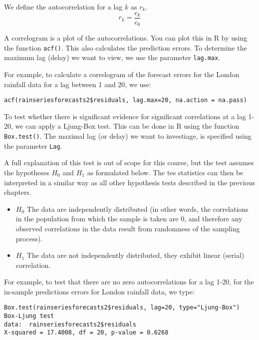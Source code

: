 \begin{definition}[Autocorrelation]
  We define the autocorrelation for a lag $k$ as $r_k$.
	\[ r_k = \frac{c_k}{c_0} \]
\end{definition}

A correlogram is a plot of the autocorrelations. You can plot this in R by using the function \texttt{acf()}. This also calculates the prediction errors. To determine the maximum lag (delay) we want to view, we use the parameter \texttt{lag.max}.

For example, to calculate a correlogram of the forecast errors for the London rainfall data for a lag between 1 and 20, we use:

\begin{lstlisting}
acf(rainseriesforecasts2$residuals, lag.max=20, na.action = na.pass)
\end{lstlisting}

To test whether there is significant evidence for significant correlations at a lag 1-20, we can apply a Ljung-Box test. This can be done in R using the function \texttt{Box.test()}. The maximal lag (or delay) we want to investiage, is specified using the parameter \texttt{Lag}.

A full explanation of this test is out of scope for this course, but the test assumes the hypotheses $H_0$ and $H_1$ as formulated below. The tes statistics can then be interpreted in a similar way as all other  hypothesis tests described in the previous chapters.

\begin{itemize}
  \item $H_0$ The data are independently distributed (in other words, the correlations in the population from which the sample is taken are 0, and therefore  any observed correlations in the data result from randomness of the sampling process).
  \item $H_1$ The data are not independently distributed, they exhibit linear (serial) correlation.
\end{itemize}

For example, to test that there are no zero autocorrelations for a lag 1-20, for the in-sample predictions errors for London rainfall data, we type:


\begin{lstlisting}
Box.test(rainseriesforecasts2$residuals, lag=20, type="Ljung-Box")
Box-Ljung test
data:  rainseriesforecasts2$residuals
X-squared = 17.4008, df = 20, p-value = 0.6268
\end{lstlisting}

